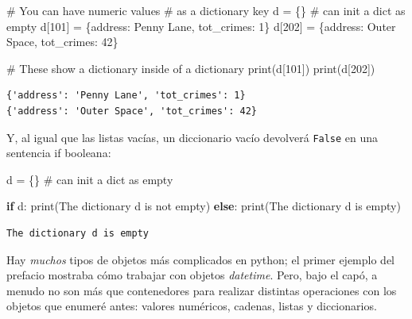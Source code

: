 \documentclass[
  letterpaper,
]{scrbook}
\newenvironment{Shaded}{\begin{snugshade}}{\end{snugshade}}
\newcommand{\BuiltInTok}[1]{\textcolor[rgb]{0.00,0.23,0.31}{#1}}
\newcommand{\CommentTok}[1]{\textcolor[rgb]{0.37,0.37,0.37}{#1}}
\newcommand{\ControlFlowTok}[1]{\textcolor[rgb]{0.00,0.23,0.31}{\textbf{#1}}}
\newcommand{\DecValTok}[1]{\textcolor[rgb]{0.68,0.00,0.00}{#1}}
\newcommand{\NormalTok}[1]{\textcolor[rgb]{0.00,0.23,0.31}{#1}}
\newcommand{\OperatorTok}[1]{\textcolor[rgb]{0.37,0.37,0.37}{#1}}
\newcommand{\StringTok}[1]{\textcolor[rgb]{0.13,0.47,0.30}{#1}}
\begin{document}
\begin{Shaded}
\begin{Highlighting}[]
\CommentTok{\# You can have numeric values}
\CommentTok{\# as a dictionary key}
\NormalTok{d }\OperatorTok{=}\NormalTok{ \{\} }\CommentTok{\# can init a dict as empty}
\NormalTok{d[}\DecValTok{101}\NormalTok{] }\OperatorTok{=}\NormalTok{ \{}\StringTok{\textquotesingle{}address\textquotesingle{}}\NormalTok{: }\StringTok{\textquotesingle{}Penny Lane\textquotesingle{}}\NormalTok{, }\StringTok{\textquotesingle{}tot\_crimes\textquotesingle{}}\NormalTok{: }\DecValTok{1}\NormalTok{\}}
\NormalTok{d[}\DecValTok{202}\NormalTok{] }\OperatorTok{=}\NormalTok{ \{}\StringTok{\textquotesingle{}address\textquotesingle{}}\NormalTok{: }\StringTok{\textquotesingle{}Outer Space\textquotesingle{}}\NormalTok{, }\StringTok{\textquotesingle{}tot\_crimes\textquotesingle{}}\NormalTok{: }\DecValTok{42}\NormalTok{\}}

\CommentTok{\# These show a dictionary inside of a dictionary}
\BuiltInTok{print}\NormalTok{(d[}\DecValTok{101}\NormalTok{])}
\BuiltInTok{print}\NormalTok{(d[}\DecValTok{202}\NormalTok{])}
\end{Highlighting}
\end{Shaded}

\begin{verbatim}
{'address': 'Penny Lane', 'tot_crimes': 1}
{'address': 'Outer Space', 'tot_crimes': 42}
\end{verbatim}

Y, al igual que las listas vacías, un diccionario vacío devolverá
\texttt{False} en una sentencia if booleana:

\begin{Shaded}
\begin{Highlighting}[]
\NormalTok{d }\OperatorTok{=}\NormalTok{ \{\} }\CommentTok{\# can init a dict as empty}

\ControlFlowTok{if}\NormalTok{ d:}
  \BuiltInTok{print}\NormalTok{(}\StringTok{\textquotesingle{}The dictionary d is not empty\textquotesingle{}}\NormalTok{)}
\ControlFlowTok{else}\NormalTok{:}
  \BuiltInTok{print}\NormalTok{(}\StringTok{\textquotesingle{}The dictionary d is empty\textquotesingle{}}\NormalTok{)}
\end{Highlighting}
\end{Shaded}

\begin{verbatim}
The dictionary d is empty
\end{verbatim}

Hay \emph{muchos} tipos de objetos más complicados en python; el primer
ejemplo del prefacio mostraba cómo trabajar con objetos \emph{datetime}.
Pero, bajo el capó, a menudo no son más que contenedores para realizar
distintas operaciones con los objetos que enumeré antes: valores
numéricos, cadenas, listas y diccionarios.


\backmatter
\end{document}
